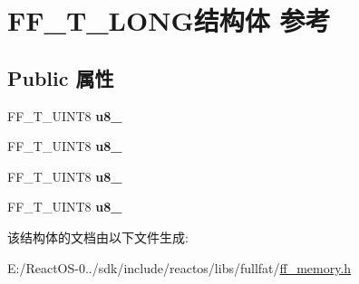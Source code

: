 \hypertarget{struct_f_f___t___l_o_n_g}{}\section{F\+F\+\_\+\+T\+\_\+\+L\+O\+N\+G结构体 参考}
\label{struct_f_f___t___l_o_n_g}
\subsection*{Public 属性}
\begin{DoxyCompactItemize}
\item 
\mbox{\label{struct_f_f___t___l_o_n_g_a00149fa5e7667d72048c1e490d0da1e8}} 
F\+F\+\_\+\+T\+\_\+\+U\+I\+N\+T8 {\bfseries u8\+\_}
\item 
\mbox{\label{struct_f_f___t___l_o_n_g_a64236453a8644be1c5294ffe5ff70244}} 
F\+F\+\_\+\+T\+\_\+\+U\+I\+N\+T8 {\bfseries u8\+\_}
\item 
\mbox{\label{struct_f_f___t___l_o_n_g_acc669bf741645dde3843d13f60ac3571}} 
F\+F\+\_\+\+T\+\_\+\+U\+I\+N\+T8 {\bfseries u8\+\_}
\item 
\mbox{\label{struct_f_f___t___l_o_n_g_a956d69f3749dcfd6c219ce86c2409df6}} 
F\+F\+\_\+\+T\+\_\+\+U\+I\+N\+T8 {\bfseries u8\+\_}
\end{DoxyCompactItemize}


该结构体的文档由以下文件生成\+:\begin{DoxyCompactItemize}
\item 
E\+:/\+React\+O\+S-\/0../sdk/include/reactos/libs/fullfat/\hyperlink{ff__memory_8h}{ff\+\_\+memory.\+h}\end{DoxyCompactItemize}
